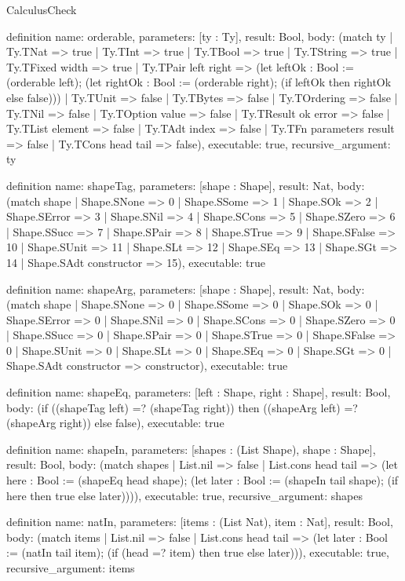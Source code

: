 \begin{lexlean}{CalculusCheck}
\begin{semanticmodule}
definition{
  name: orderable,
  parameters: [ty : Ty],
  result: Bool,
  body: (match ty
    | Ty.TNat => true
    | Ty.TInt => true
    | Ty.TBool => true
    | Ty.TString => true
    | Ty.TFixed width => true
    | Ty.TPair left right => (let leftOk : Bool := (orderable left); (let rightOk : Bool := (orderable right); (if leftOk then rightOk else false)))
    | Ty.TUnit => false
    | Ty.TBytes => false
    | Ty.TOrdering => false
    | Ty.TNil => false
    | Ty.TOption value => false
    | Ty.TResult ok error => false
    | Ty.TList element => false
    | Ty.TAdt index => false
    | Ty.TFn parameters result => false
    | Ty.TCons head tail => false),
  executable: true,
  recursive_argument: ty
}

definition{
  name: shapeTag,
  parameters: [shape : Shape],
  result: Nat,
  body: (match shape
    | Shape.SNone => 0
    | Shape.SSome => 1
    | Shape.SOk => 2
    | Shape.SError => 3
    | Shape.SNil => 4
    | Shape.SCons => 5
    | Shape.SZero => 6
    | Shape.SSucc => 7
    | Shape.SPair => 8
    | Shape.STrue => 9
    | Shape.SFalse => 10
    | Shape.SUnit => 11
    | Shape.SLt => 12
    | Shape.SEq => 13
    | Shape.SGt => 14
    | Shape.SAdt constructor => 15),
  executable: true
}

definition{
  name: shapeArg,
  parameters: [shape : Shape],
  result: Nat,
  body: (match shape
    | Shape.SNone => 0
    | Shape.SSome => 0
    | Shape.SOk => 0
    | Shape.SError => 0
    | Shape.SNil => 0
    | Shape.SCons => 0
    | Shape.SZero => 0
    | Shape.SSucc => 0
    | Shape.SPair => 0
    | Shape.STrue => 0
    | Shape.SFalse => 0
    | Shape.SUnit => 0
    | Shape.SLt => 0
    | Shape.SEq => 0
    | Shape.SGt => 0
    | Shape.SAdt constructor => constructor),
  executable: true
}

definition{
  name: shapeEq,
  parameters: [left : Shape, right : Shape],
  result: Bool,
  body: (if ((shapeTag left) =? (shapeTag right)) then ((shapeArg left) =? (shapeArg right)) else false),
  executable: true
}

definition{
  name: shapeIn,
  parameters: [shapes : (List Shape), shape : Shape],
  result: Bool,
  body: (match shapes
    | List.nil => false
    | List.cons head tail => (let here : Bool := (shapeEq head shape); (let later : Bool := (shapeIn tail shape); (if here then true else later)))),
  executable: true,
  recursive_argument: shapes
}

definition{
  name: natIn,
  parameters: [items : (List Nat), item : Nat],
  result: Bool,
  body: (match items
    | List.nil => false
    | List.cons head tail => (let later : Bool := (natIn tail item); (if (head =? item) then true else later))),
  executable: true,
  recursive_argument: items
}


\end{semanticmodule}
\end{lexlean}
